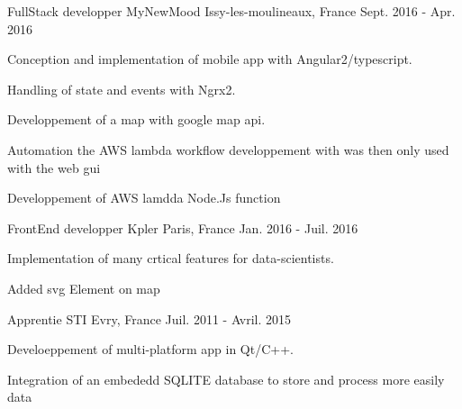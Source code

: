 \begin{cventries}
  \cventry
    {FullStack developper} %
    {MyNewMood} %
    {Issy-les-moulineaux, France} %
    {Sept. 2016 - Apr. 2016} %
    {
      \begin{cvitems} %
        \item {Conception and implementation of mobile app  with Angular2/typescript.}
        \item {Handling of state and events with Ngrx2.}
        \item {Developpement of a map with google map api.}
        \item {Automation the AWS lambda workflow developpement with was then only used with the web gui}
        \item {Developpement of AWS lamdda Node.Js function}
      \end{cvitems}
    }

  \cventry
    {FrontEnd developper} %
    {Kpler} %
    {Paris, France} %
    {Jan. 2016 - Juil. 2016} %
    {
      \begin{cvitems} %
        \item {Implementation of many crtical features for  data-scientists.}
        \item {Added svg Element on map}
      \end{cvitems}
    }

  \cventry
    {Apprentie} %
    {STI} %
    {Evry, France} %
    {Juil. 2011 - Avril. 2015} %
    {
      \begin{cvitems} %
        \item {Develoeppement of multi-platform app in Qt/C++.}
        \item {Integration of an embededd SQLITE database to store and process more easily data}
      \end{cvitems}
    }
\end{cventries}
